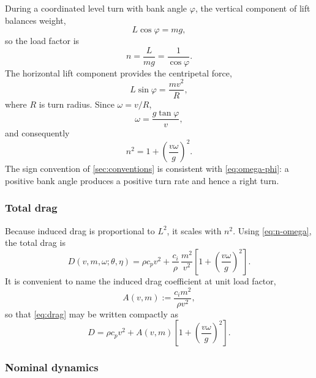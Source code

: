 \documentclass[11pt,a4paper]{article}
\newcommand{\vectheta}{\theta}
\newcommand{\veceta}{\eta}
\begin{document}
During a coordinated level turn with bank angle $\varphi$, the vertical
component of lift balances weight,
\begin{equation}
  L\cos\varphi = mg,
\end{equation}
so the load factor is
\begin{equation}
  n = \frac{L}{mg} = \frac{1}{\cos\varphi} .
  \label{eq:load-factor-def}
\end{equation}
The horizontal lift component provides the centripetal force,
\begin{equation}
  L\sin\varphi = \frac{mv^{2}}{R},
\end{equation}
where $R$ is turn radius. Since $\omega = v/R$,
\begin{equation}
  \omega = \frac{g\tan\varphi}{v},
  \label{eq:omega-phi}
\end{equation}
and consequently
\begin{equation}
  n^{2} = 1 + \left(\frac{v\omega}{g}\right)^{2} .
  \label{eq:n-omega}
\end{equation}
The sign convention of \cref{sec:conventions} is consistent with
\cref{eq:omega-phi}: a positive bank angle produces a positive turn rate and
hence a right turn.

\subsubsection{Total drag}

Because induced drag is proportional to $L^{2}$, it scales with $n^{2}$. Using
\cref{eq:n-omega}, the total drag is
\begin{equation}
  D(v, m, \omega; \vectheta, \veceta)
  = \rho c_p v^{2}
  + \frac{c_i}{\rho}\,\frac{m^{2}}{v^{2}}
    \left[ 1 + \left(\frac{v\omega}{g}\right)^{2} \right] .
  \label{eq:drag}
\end{equation}
It is convenient to name the induced drag coefficient at unit load factor,
\begin{equation}
  A(v,m) := \frac{c_i m^{2}}{\rho v^{2}},
  \label{eq:A}
\end{equation}
so that \cref{eq:drag} may be written compactly as
\begin{equation}
  D = \rho c_p v^{2} + A(v,m)\left[1 + \left(\frac{v\omega}{g}\right)^{2}\right].
  \label{eq:drag-compact}
\end{equation}

\subsubsection{Nominal dynamics}
\end{document}
